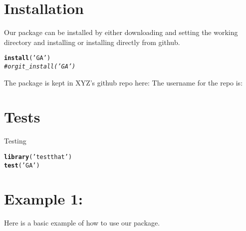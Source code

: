 \documentclass{article}\usepackage[]{graphicx}\usepackage[]{color}
\makeatletter
\newcommand{\hlstr}[1]{\textcolor[rgb]{0.192,0.494,0.8}{#1}}%
\newcommand{\hlcom}[1]{\textcolor[rgb]{0.678,0.584,0.686}{\textit{#1}}}%
\newcommand{\hlstd}[1]{\textcolor[rgb]{0.345,0.345,0.345}{#1}}%
\newcommand{\hlkwd}[1]{\textcolor[rgb]{0.737,0.353,0.396}{\textbf{#1}}}%
\newenvironment{kframe}{%
 \def\at@end@of@kframe{}%
 \ifinner\ifhmode%
  \def\at@end@of@kframe{\end{minipage}}%
  \begin{minipage}{\columnwidth}%
 \fi\fi%
 \def\FrameCommand##1{\hskip\@totalleftmargin \hskip-\fboxsep
 \colorbox{shadecolor}{##1}\hskip-\fboxsep
     \hskip-\linewidth \hskip-\@totalleftmargin \hskip\columnwidth}%
 \MakeFramed {\advance\hsize-\width
   \@totalleftmargin\z@ \linewidth\hsize
   \@setminipage}}%
 {\par\unskip\endMakeFramed%
 \at@end@of@kframe}
\newenvironment{knitrout}{}{} %
\makeatother
\begin{document}
\section*{Installation}

Our package can be installed by either downloading and setting the working directory and installing or installing directly from github.


\begin{knitrout}
\color{fgcolor}\begin{kframe}
\begin{alltt}
\hlkwd{install}\hlstd{(}\hlstr{'GA'}\hlstd{)}
\hlcom{# or git_install('GA')}
\end{alltt}
\end{kframe}
\end{knitrout}

The package is kept in XYZ's github repo here:
The username for the repo is:

\section*{Tests}

Testing
\begin{knitrout}
\color{fgcolor}\begin{kframe}
\begin{alltt}
\hlkwd{library}\hlstd{(}\hlstr{'testthat'}\hlstd{)}
\hlkwd{test}\hlstd{(}\hlstr{'GA'}\hlstd{)}
\end{alltt}
\end{kframe}
\end{knitrout}

\section*{Example 1:}

Here is a basic example of how to use our package.
\end{document}
